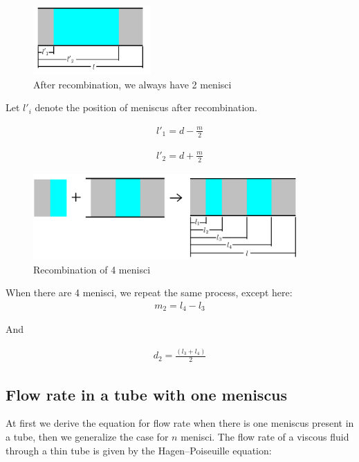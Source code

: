 \documentclass{crm-article}
\begin{document}
		\begin{figure}[H]
			\centering
			\includegraphics[width=0.4\textwidth]{fig_center-of-mass_final}
			\caption{After recombination, we always have 2 menisci}
		\end{figure}
		
		Let ${l'}_i$ denote the position of meniscus after recombination.
		
		\begin{gather}
			{l'}_1 = d - \frac{m}{2}
		\end{gather}
		
		\begin{gather}
			{l'}_2 = d + \frac{m}{2}
		\end{gather}
		

		\begin{figure}[H]
			\centering
			\includegraphics[width=0.9\textwidth]{fig_center-of-mass_2}
			\caption{Recombination of 4 menisci}
		\end{figure}
		
		When there are 4 menisci, we repeat the same process, except here:
		\begin{gather}
			m_2 = l_4 - l_3
		\end{gather}
		
		And
		
		\begin{gather}	
			d_2 = \frac{(l_3 + l_4)}{2}
		\end{gather}

	\subsection{Flow rate in a tube with one meniscus} \label{sec:simple-flow-rate}
		At first we derive the equation for flow rate when there is one meniscus present in a tube, then we generalize the case for $n$ menisci. The flow rate of a viscous fluid through a thin tube is given by the Hagen–Poiseuille equation:
		
\end{document}
